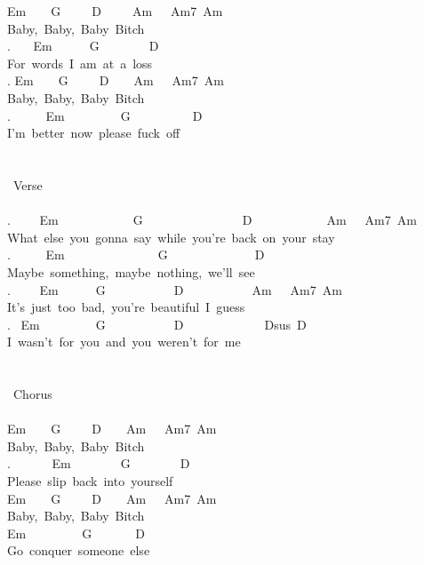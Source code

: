 {Em\ \ \ \ G\ \ \ \ \ D\ \ \ \ \ Am\ \ \ Am7\ Am\\
Baby,\ Baby,\ Baby\ Bitch\\
. \ \ \ Em\ \ \ \ \ \ G\ \ \ \ \ \ \ \ D\\
For\ words\ I\ am\ at\ a\ loss\\
. Em\ \ \ \ G\ \ \ \ \ D\ \ \ \ Am\ \ \ Am7\ Am\\
Baby,\ Baby,\ Baby\ Bitch\\
. \ \ \ \ \ Em\ \ \ \ \ \ \ \ \ G\ \ \ \ \ \ \ \ \ \ D\\
I'm\ better\ now\ please\ fuck\ off\\
\\
\\
\lbrack\ Verse\rbrack\\
\\
. \ \ \ \ Em\ \ \ \ \ \ \ \ \ \ \ \ G\ \ \ \ \ \ \ \ \ \ \ \ \ \ \ \ D\ \ \ \ \ \ \ \ \ \ \ \ Am\ \ \ Am7\ Am\\
What\ else\ you\ gonna\ say\ while\ you're\ back\ on\ your\ stay\\
. \ \ \ \ \ Em\ \ \ \ \ \ \ \ \ \ \ \ \ \ \ G\ \ \ \ \ \ \ \ \ \ \ \ \ \ D\\
Maybe\ something,\ maybe\ nothing,\ we'll\ see\\
. \ \ \ \ Em\ \ \ \ \ \ G\ \ \ \ \ \ \ \ \ \ \ D\ \ \ \ \ \ \ \ \ \ \ Am\ \ \ Am7\ Am\\
It's\ just\ too\ bad,\ you're\ beautiful\ I\ guess\\
. \ Em\ \ \ \ \ \ \ \ \ G\ \ \ \ \ \ \ \ \ \ \ D\ \ \ \ \ \ \ \ \ \ \ \ \ Dsus\ D\\
I\ wasn't\ for\ you\ and\ you\ weren't\ for\ me\\
\\
\\
\lbrack\ Chorus\rbrack\\
\\
Em\ \ \ \ G\ \ \ \ \ D\ \ \ \ Am\ \ \ Am7\ Am\\
Baby,\ Baby,\ Baby\ Bitch\\
. \ \ \ \ \ \ Em\ \ \ \ \ \ \ \ G\ \ \ \ \ \ \ \ D\\
Please\ slip\ back\ into\ yourself\\
Em\ \ \ \ G\ \ \ \ \ D\ \ \ \ Am\ \ \ Am7\ Am\\
Baby,\ Baby,\ Baby\ Bitch\\
Em\ \ \ \ \ \ \ \ \ G\ \ \ \ \ \ \ D\\
Go\ conquer\ someone\ else\\
\\
}
